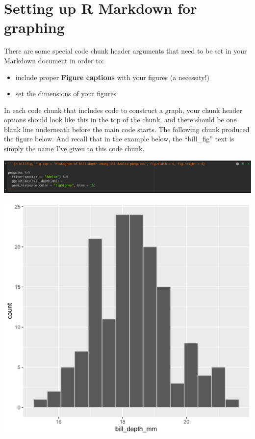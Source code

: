 \documentclass[
]{book}
\providecommand{\tightlist}{%
  \setlength{\itemsep}{0pt}\setlength{\parskip}{0pt}}
\begin{document}
\section{Setting up R Markdown for graphing}\label{rmd_graphing}

There are some special code chunk header arguments that need to be set in your Markdown document in order to:

\begin{itemize}
\tightlist
\item
  include proper \textbf{Figure captions} with your figures (a necessity!)
\item
  set the dimensions of your figures
\end{itemize}

In each code chunk that includes code to construct a graph, your chunk header options should look like this in the top of the chunk, and there should be one blank line underneath before the main code starts. The following chunk produced the figure below. And recall that in the example below, the ``bill\_fig'' text is simply the name I've given to this code chunk.

\includegraphics[width=33.92in]{./more/figure_chunk_header}

\includegraphics[width=19.58in]{./more/example_histogram_practice}
\end{document}
